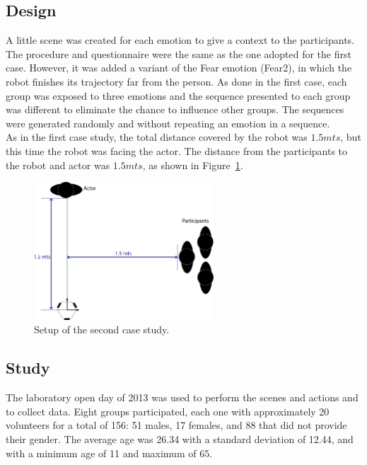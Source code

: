 \subsection{Design}
A little scene was created for each emotion to give a context to the participants. The procedure and questionnaire were the same as the one adopted for the first case. However, it was added a variant of the Fear emotion (Fear2), in which the robot finishes its trajectory far from the person. As done in the first case, each group was exposed to three emotions and the sequence presented to each group was different to eliminate the chance to influence other groups. The sequences were generated randomly and without repeating an emotion in a sequence.\\
As in the first case study, the total distance covered by the robot was $1.5 mts$, but this time the robot was facing the actor. The distance from the participants to the robot and actor was $1.5 mts$, as shown in Figure~\ref{fig:setup2}. 
\begin{figure}
	\centering
	\includegraphics[width=0.6\textwidth]{./Images/SecondCase.png} 
	\caption{Setup of the second case study.}
	\label{fig:setup2}
\end{figure}
\subsection{Study}
The laboratory open day of 2013 was used to perform the scenes and actions and to collect data. Eight groups participated, each one with approximately 20 volunteers for a total of 156: 51 males, 17 females, and 88 that did not provide their gender. The average age was 26.34 with a standard deviation of 12.44, and with a minimum age of 11 and maximum of 65.
